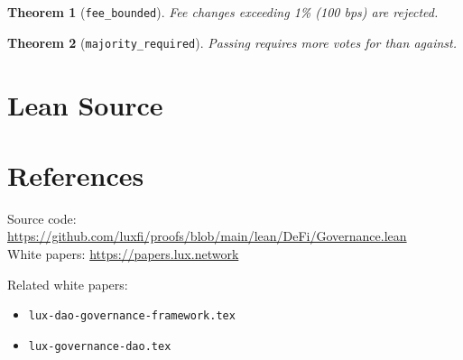 \documentclass[11pt]{article}
\newtheorem{theorem}{Theorem}
\begin{document}
\begin{theorem}[\texttt{fee\_bounded}]
Fee changes exceeding 1\% (100 bps) are rejected.
\end{theorem}

\begin{theorem}[\texttt{majority\_required}]
Passing requires more votes for than against.
\end{theorem}


\section{Lean Source}


\section{References}
\noindent Source code: \url{https://github.com/luxfi/proofs/blob/main/lean/DeFi/Governance.lean}\\
\noindent White papers: \url{https://papers.lux.network}

\noindent Related white papers:
\begin{itemize}
  \item \texttt{lux-dao-governance-framework.tex}
  \item \texttt{lux-governance-dao.tex}
\end{itemize}
\end{document}
